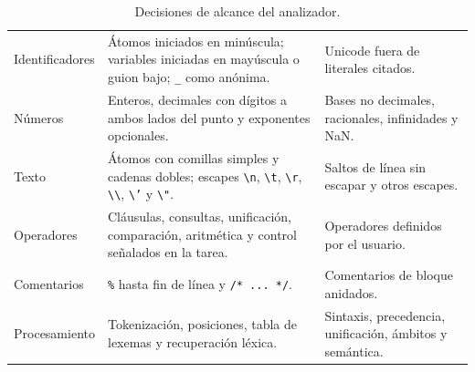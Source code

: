 \begin{table}[H]
\centering
\small
\caption{Decisiones de alcance del analizador.}
\label{tab:alcance}
\begin{tabularx}{\textwidth}{L{2.85cm}YY}
\toprule
{} &  &  \\
\midrule
Identificadores & Átomos iniciados en minúscula; variables iniciadas en mayúscula o guion bajo; \texttt{\_} como anónima. & Unicode fuera de literales citados. \\
 Números & Enteros, decimales con dígitos a ambos lados del punto y exponentes opcionales. & Bases no decimales, racionales, infinidades y NaN. \\
Texto & Átomos con comillas simples y cadenas dobles; escapes \texttt{\textbackslash n}, \texttt{\textbackslash t}, \texttt{\textbackslash r}, \texttt{\textbackslash\textbackslash}, \texttt{\textbackslash'} y \texttt{\textbackslash"}. & Saltos de línea sin escapar y otros escapes. \\
 Operadores & Cláusulas, consultas, unificación, comparación, aritmética y control señalados en la tarea. & Operadores definidos por el usuario. \\
Comentarios & \texttt{\%} hasta fin de línea y \texttt{/* ... */}. & Comentarios de bloque anidados. \\
 Procesamiento & Tokenización, posiciones, tabla de lexemas y recuperación léxica. & Sintaxis, precedencia, unificación, ámbitos y semántica. \\
\bottomrule
\end{tabularx}
\end{table}
